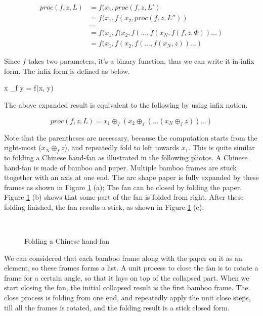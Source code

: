 \documentclass{article}
\begin{document}
\[
\begin{array}{rl}
proc(f, z, L) & = f(x_1, proc(f, z, L') \\
        & = f(x_1, f(x_2, proc(f, z, L'')) \\
        & ... \\
        & = f(x_1, f(x_2, f(..., f(x_N, f(f, z, \Phi))...) \\
        & = f(x_1, f(x_2, f(..., f(x_N, z))...)
\end{array}
\]

Since $f$ takes two parameters, it's a binary function, thus we can write it in infix form. The infix
form is defined as below.

\be
x \oplus_f y = f(x, y)
\ee

The above expanded result is equivalent to the following by using infix notion.

\[
proc(f, z, L) = x_1 \oplus_f (x_2 \oplus_f (... (x_N \oplus_f z))...)
\]

Note that the parentheses are necessary, because the computation starts from the right-most ($x_N \oplus_f z$),
and repeatedly fold to left towards $x_1$. This is quite similar to folding a Chinese hand-fan as illustrated
in the following photos. A Chinese hand-fan is made of bamboo and paper. Multiple bamboo frames are stuck
ttogether with an axis at one end. The arc shape paper is fully expanded by these frames as shown in Figure 
\ref{fig:fold-fan} (a);
The fan can be closed by folding the paper. Figure \ref{fig:fold-fan} (b) shows that some part of the fan
is folded from right. After these folding finished, the fan results a stick, as shown in Figure \ref{fig:fold-fan} (c).

\begin{figure}[htbp]
    \centering
     \\
    \caption{Folding a Chinese hand-fan} \label{fig:fold-fan}
\end{figure}

We can considered that each bamboo frame along with the paper on it as an element, so these frames forms a
list. A unit process to close the fan is to rotate a frame for a certain angle, so that it lays on top
of the collapsed part. When we start closing the fan, the initial collapsed result is the first bamboo frame.
The close process is folding from one end, and repeatedly apply the unit close steps, till all the frames
is rotated, and the folding result is a stick closed form.
\end{document}
